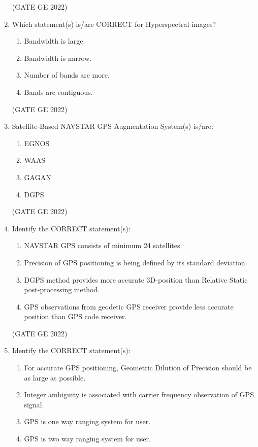\documentclass[a4paper, 11pt]{article}
\begin{document}
\begin{enumerate}
\hfill (GATE GE 2022)

\item Which statement(s) is/are CORRECT for Hyperspectral images?
\begin{enumerate}
    \item Bandwidth is large.
    \item Bandwidth is narrow.
    \item Number of bands are more.
    \item Bands are contiguous.
\end{enumerate}

\hfill (GATE GE 2022)

\item Satellite-Based NAVSTAR GPS Augmentation System(s) is/are:
\begin{enumerate}
    \item EGNOS
    \item WAAS
    \item GAGAN
    \item DGPS
\end{enumerate}

\hfill (GATE GE 2022)

\item Identify the CORRECT statement(s):
\begin{enumerate}
    \item NAVSTAR GPS consists of minimum 24 satellites.
    \item Precision of GPS positioning is being defined by its standard deviation.
    \item DGPS method provides more accurate 3D-position than Relative Static post-processing method.
    \item GPS observations from geodetic GPS receiver provide less accurate position than GPS code receiver.
\end{enumerate}

\hfill (GATE GE 2022)

\item Identify the CORRECT statement(s):
\begin{enumerate}
    \item For accurate GPS positioning, Geometric Dilution of Precision should be as large as possible.
    \item Integer ambiguity is associated with carrier frequency observation of GPS signal.
    \item GPS is one way ranging system for user.
    \item GPS is two way ranging system for user.
\end{enumerate}


\end{enumerate}
\end{document}
